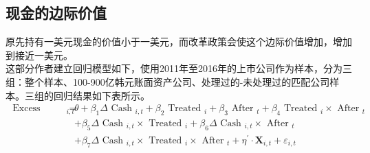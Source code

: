 \documentclass{article}
\begin{document}
\subsection{现金的边际价值}
\indent 原先持有一美元现金的价值小于一美元，而改革政策会使这个边际价值增加，增加到接近一美元。\\
\indent 这部分作者建立回归模型如下，使用2011年至2016年的上市公司作为样本，分为三组：整个样本、100-900亿韩元账面资产公司、处理过的-未处理过的匹配公司样本。三组的回归结果如下表所示。\\
\begin{equation}
    \begin{split}
        \text { Excess Return }_{i, t}= &\theta+\beta_{1} \Delta \text { Cash }_{i, t}+\beta_{2} \text { Treated }_{i}+\beta_{3} \text { After }_{t}+\beta_{4} \text { Treated }_{i} \times \text { After }_{t} \\
        &+\beta_{5} \Delta \text { Cash }_{i, t} \times \text { Treated }_{i}+\beta_{6} \Delta \text { Cash }_{i, t} \times \text { After }_{t} \\ &+\beta_{7} \Delta \text { Cash }_{i, t} \times \text { Treated }_{i} \times \text { After }_{t}+\eta^{\prime} \cdot \mathbf{X}_{i, t}+\varepsilon_{i, t} \\  
    \end{split}
\end{equation}
\end{document}
